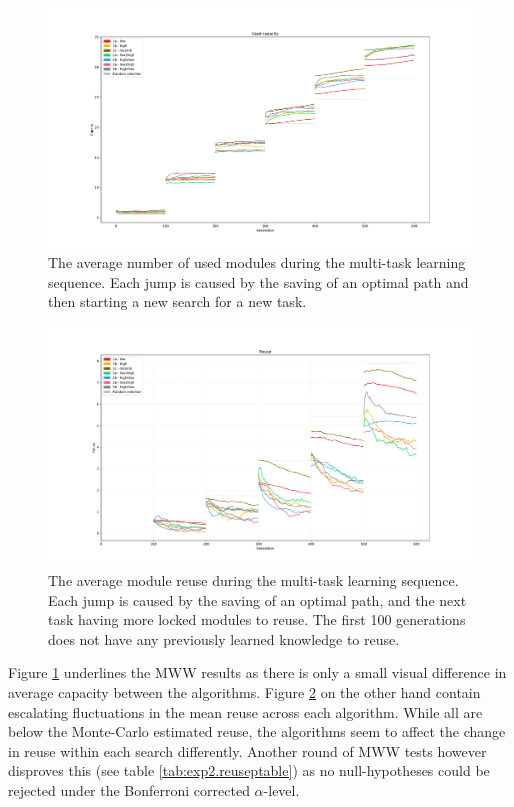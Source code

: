 \begin{figure}[p!]
    \includegraphics[width=1.2\textwidth,center]{Chapters/4.Experiments/exp2/figures/Capacity_pr_generation.pdf}
    \caption{The average number of used modules during the multi-task learning sequence. Each jump is caused by the saving of an optimal path and then starting a new search for a new task. }
    \label{fig:search.capacity}
\end{figure}

\begin{figure}[p!]
    \includegraphics[width=1.2\textwidth,center]{Chapters/4.Experiments/exp2/figures/Module_reuse_pr_generation.pdf}
    \caption{The average module reuse during the multi-task learning sequence. Each jump is caused by the saving of an optimal path, and the next task having more locked modules to reuse. The first 100 generations does not have any previously learned knowledge to reuse.}
    \label{fig:search.reuse}
\end{figure}

Figure \ref{fig:search.capacity} underlines the MWW results as there is only a small visual difference in average capacity between the algorithms.  Figure \ref{fig:search.reuse} on the other hand contain escalating fluctuations in the mean reuse across each algorithm. While all are below the Monte-Carlo estimated reuse, the algorithms seem to affect the change in reuse within each search differently. Another round of MWW tests however disproves this (see table \ref{tab:exp2.reuseptable}) as no null-hypotheses could be rejected under the Bonferroni corrected \(\alpha\)-level.

